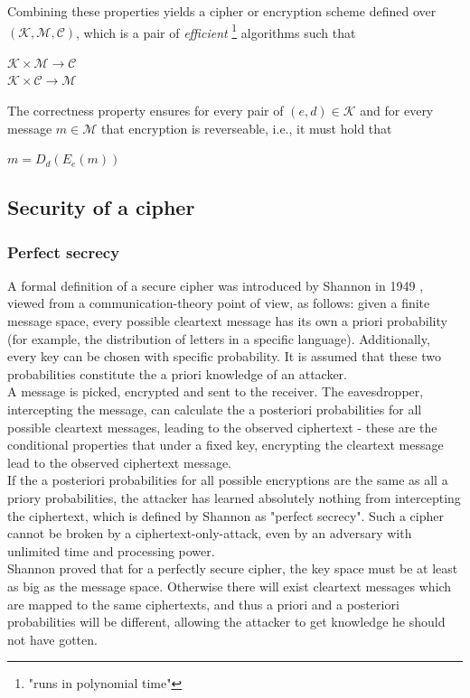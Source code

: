 Combining these properties yields a cipher or encryption scheme defined over $\mathcal{(K,M,C)}$, which is a pair of \textit{efficient}
 \footnote{"runs in polynomial time"} algorithms such that
 \begin{center}
   $\mathcal{K} \times \mathcal{M} \rightarrow \mathcal{C}$
   \\
   $\mathcal{K} \times \mathcal{C} \rightarrow \mathcal{M}$
 \end{center}
 The correctness property ensures for every pair of $(e,d) \in \mathcal{K}$ and for every message $m \in \mathcal{M}$ that encryption is reverseable, i.e., 
 it must hold that 
 \begin{center}  
 $ m = D_d(E_e(m))$
  \end{center}

\subsection{Security of a cipher}

\subsubsection{Perfect secrecy}

A formal definition of a secure cipher was introduced by Shannon in 1949 \cite{6769090}, viewed from a communication-theory point of view, as follows:
given a finite message space, every possible cleartext message has its own a priori probability (for example, the distribution of letters in a 
specific language). Additionally, every key can be chosen with specific probability. It is assumed that these
two probabilities constitute the a priori knowledge of an attacker.
\\
A message is picked, encrypted
and sent to the receiver. The eavesdropper, intercepting the message, can calculate the a posteriori probabilities for all possible cleartext messages, 
leading to the observed ciphertext - these are the conditional properties that under a fixed key, encrypting the cleartext message lead to the
observed ciphertext message.
\\
If the a posteriori probabilities for all possible encryptions are the same as all a priory probabilities, the attacker has learned absolutely
nothing from intercepting the ciphertext, which is defined by Shannon as "perfect secrecy". Such a cipher cannot be broken by a ciphertext-only-attack,
even by an adversary with unlimited time and processing power.
\\
Shannon proved that for a perfectly secure cipher, the key space must be at least as big as the message space.
Otherwise there will exist cleartext messages which are mapped to the same ciphertexts, and thus a priori and a posteriori probabilities will be different,
allowing the attacker to get knowledge he should not have gotten. 

